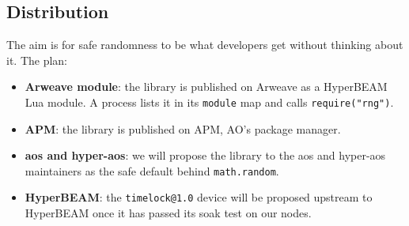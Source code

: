 \subsection{Distribution}\label{sec:distribution}
The aim is for safe randomness to be what developers get without thinking about it. The plan:
\begin{itemize}
    \item \textbf{Arweave module}: the library is published on Arweave as a HyperBEAM Lua module. A process lists it in its \texttt{module} map and calls \texttt{require("rng")}.
    \item \textbf{APM}: the library is published on APM, AO's package manager.
    \item \textbf{aos and hyper-aos}: we will propose the library to the aos and hyper-aos maintainers as the safe default behind \texttt{math.random}.
    \item \textbf{HyperBEAM}: the \texttt{timelock@1.0} device will be proposed upstream to HyperBEAM once it has passed its soak test on our nodes.
\end{itemize}
